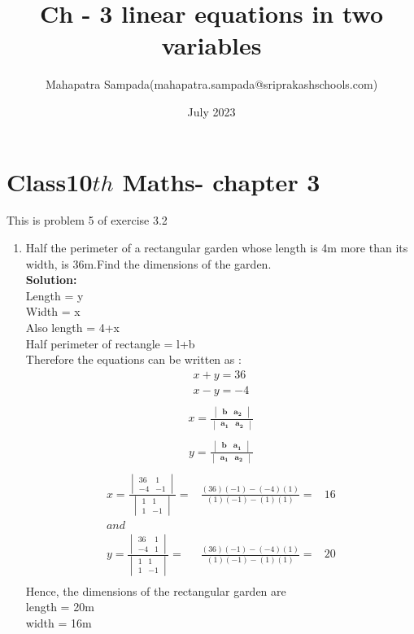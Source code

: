 \documentclass{article}
\title{Ch - 3 linear equations in two variables}
\author{Mahapatra Sampada(mahapatra.sampada@sriprakashschools.com)}
\date{July 2023}
\newcommand{\mydet}[1]{\ensuremath{\begin{vmatrix}#1\end{vmatrix}}}
\newcommand{\solution}{\noindent \textbf{Solution: }}
\let\vec\mathbf
\begin{document}
\maketitle
\section*{Class10${th}$ Maths- chapter 3}
This is problem 5 of exercise 3.2
\begin{enumerate}
\item Half the perimeter of a rectangular garden whose length is 4m more than its width, is 36m.Find the dimensions of the garden.\\

\solution\\
Length = y\\
Width = x\\
Also length = 4+x \\
Half perimeter of rectangle = l+b\\
Therefore the equations can be written as :
\begin{align}
x+y=36\\
x-y=-4\\
\end{align}
\begin{align}
x =\frac{\mydet{ \vec{b} & \vec{a_2}}}{\mydet{ \vec{a_1} &\vec{a_2} }}\\
\end{align}
\begin{align}   
    y = \frac{\mydet{ \vec{b} & \vec{a_1}}}{\mydet{ \vec{a_1} &\vec{a_2} }}\\
\end{align} 
 \begin{align}
x =  \frac{\mydet{ 36 & 1 \\ -4 & -1 }}{\mydet{1&1\\1&-1}} =&
\frac{(36)(-1)-(-4)(1)}{(1)(-1)-(1)(1)} =&
16\\
and\\  y = \frac{\mydet{ 36 & 1 \\ -4 & 1}}{\mydet{1&1\\1&-1}} =&
\frac{(36)(-1)-(-4)(1)}{(1)(-1)-(1)(1)} =&
20\\
\end{align}
Hence, the dimensions of the rectangular garden are\\
length = 20m\\
width = 16m
\end{enumerate}
\end{document}
